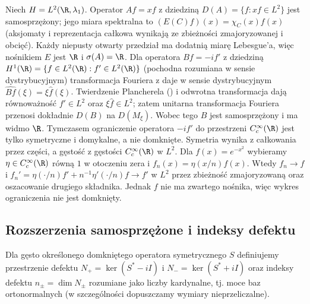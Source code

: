 \begin{przyklad}
Niech $H=L^2(\R,\lambda_1)$.
Operator $Af=xf$ z dziedziną $D(A)=\{f:xf\in L^2\}$ jest
samosprzężony; jego miara spektralna to
$(E(C)f)(x)=\chi_C(x)f(x)$ (aksjomaty i reprezentacja całkowa
wynikają ze zbieżności zmajoryzowanej i obcięć). Każdy niepusty
otwarty przedział ma dodatnią miarę Lebesgue'a, więc nośnikiem
$E$ jest $\R$ i $\sigma(A)=\R$. Dla operatora
$Bf=-if'$ z dziedziną $H^1(\R)=\{f\in L^2(\R):f'\in L^2(\R)\}$
(pochodna rozumiana w sensie dystrybucyjnym) transformacja Fouriera
z  daje w sensie
dystrybucyjnym $\widehat{Bf}(\xi)=\xi\widehat f(\xi)$.
Twierdzenie Plancherela ()
i odwrotna transformacja dają równoważność
$f'\in L^2$ oraz $\xi\widehat f\in L^2$; zatem unitarna
transformacja Fouriera przenosi dokładnie $D(B)$ na $D(M_\xi)$.
Wobec tego $B$ jest
samosprzężony i ma widmo $\R$. Tymczasem ograniczenie
operatora $-if'$ do przestrzeni $C_c^\infty(\R)$
jest tylko symetryczne i domykalne, a nie domknięte.
Symetria wynika z całkowania przez części, a gęstość z gęstości
$C_c^\infty(\R)$ w $L^2$. Dla $f(x)=e^{-x^2}$ wybieramy
$\eta\in C_c^\infty(\R)$ równą $1$ w otoczeniu zera i
$f_n(x)=\eta(x/n)f(x)$. Wtedy $f_n\to f$ i
$f_n'=\eta(\cdot/n)f'+n^{-1}\eta'(\cdot/n)f\to f'$ w $L^2$
przez zbieżność zmajoryzowaną oraz oszacowanie drugiego składnika.
Jednak $f$ nie ma zwartego nośnika, więc wykres ograniczenia
nie jest domknięty.
\end{przyklad}

\subsection{Rozszerzenia samosprzężone i indeksy defektu}

\begin{definicja}
\label{def:deficiency33}
Dla gęsto określonego domkniętego operatora symetrycznego
$S$ definiujemy przestrzenie defektu
$N_+=\ker(S^*-iI)$ i $N_-=\ker(S^*+iI)$
oraz indeksy defektu $n_\pm=\dim N_\pm$ rozumiane jako liczby
kardynalne, tj. moce baz ortonormalnych (w szczególności
dopuszczamy wymiary nieprzeliczalne).
\end{definicja}

